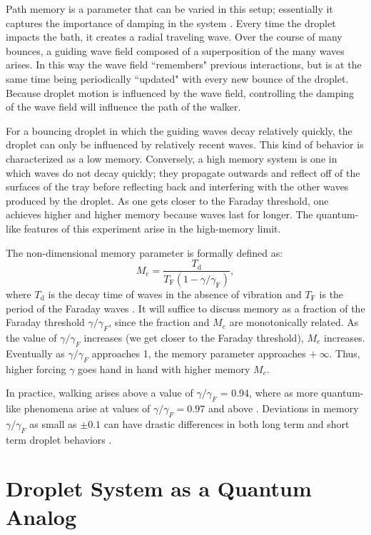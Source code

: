             Path memory is a parameter that can be varied in this setup; essentially it captures the importance of damping in the system . Every time the droplet impacts the bath, it creates a radial traveling wave. Over the course of many bounces, a guiding wave field composed of a superposition of the many waves arises. In this way the wave field ``remembers" previous interactions, but is at the same time being periodically ``updated" with every new bounce of the droplet. Because droplet motion is influenced by the wave field, controlling the damping of the wave field will influence the path of the walker. 
            
For a bouncing droplet in which the guiding waves decay relatively quickly, the droplet can only be influenced by relatively recent waves. This kind of behavior is characterized as a low memory. Conversely, a high memory system is one in which waves do not decay quickly; they propagate outwards and reflect off of the surfaces of the tray before reflecting back and interfering with the other waves produced by the droplet. As one gets closer to the Faraday threshold, one achieves higher and higher memory because waves last for longer. The quantum-like features of this experiment arise in the high-memory limit. 

The non-dimensional memory parameter is formally defined as:
$$M_e = \frac{T_\mathrm{d}}{T_\mathrm{F}(1-\gamma/\gamma_\mathrm{F})},$$
where $T_\mathrm{d}$ is the decay time of waves in the absence of vibration and $T_\mathrm{F}$ is the period of the Faraday waves . It will suffice to discuss memory as a fraction of the Faraday threshold $\gamma/\gamma_{F}$, since the fraction and $M_e$ are monotonically related. As the value of $\gamma/\gamma_{F}$ increases (we get closer to the Faraday threshold), $M_e$ increases. Eventually as $\gamma/\gamma_{F}$ approaches 1, the memory parameter approaches $+~\infty$. Thus, higher forcing $\gamma$ goes hand in hand with higher memory $M_e$. 

In practice, walking arises above a value of $\gamma/\gamma_{F}$ = 0.94, where as more quantum-like phenomena arise at values of $\gamma/\gamma_{F} = 0.97$ and above . Deviations in memory $\gamma/\gamma_{F}$ as small as $\pm 0.1$ can have drastic differences in both long term and short term droplet behaviors .
            
            
\section{Droplet System as a Quantum Analog}   

